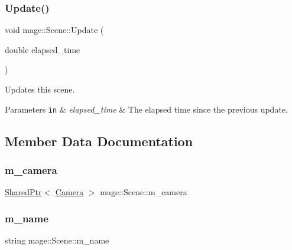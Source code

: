 \subsubsection{\texorpdfstring{Update()}{Update()}}
{\footnotesize\ttfamily void mage\+::\+Scene\+::\+Update (\begin{DoxyParamCaption}\item[{double}]{elapsed\+\_\+time }\end{DoxyParamCaption})}

Updates this scene.


\begin{DoxyParams}[1]{Parameters}
\mbox{\tt in}  & {\em elapsed\+\_\+time} & The elapsed time since the previous update. \\
\hline
\end{DoxyParams}


\subsection{Member Data Documentation}
\hypertarget{classmage_1_1_scene_a961c280659f9934441d8e835508e933d}{}\label{classmage_1_1_scene_a961c280659f9934441d8e835508e933d} 
\subsubsection{\texorpdfstring{m\+\_\+camera}{m\_camera}}
{\footnotesize\ttfamily \hyperlink{namespacemage_a1e01ae66713838a7a67d30e44c67703e}{Shared\+Ptr}$<$ \hyperlink{classmage_1_1_camera}{Camera} $>$ mage\+::\+Scene\+::m\+\_\+camera\hspace{0.3cm}{\ttfamily [private]}}

\hypertarget{classmage_1_1_scene_a6cc8cb08b1853c4e3063b33a94e8fb47}{}\label{classmage_1_1_scene_a6cc8cb08b1853c4e3063b33a94e8fb47} 
\subsubsection{\texorpdfstring{m\+\_\+name}{m\_name}}
{\footnotesize\ttfamily string mage\+::\+Scene\+::m\+\_\+name\hspace{0.3cm}{\ttfamily [private]}}

\hypertarget{classmage_1_1_scene_a74ad0b8c6b085bd519de33da51ebb8dd}{}\label{classmage_1_1_scene_a74ad0b8c6b085bd519de33da51ebb8dd} 
